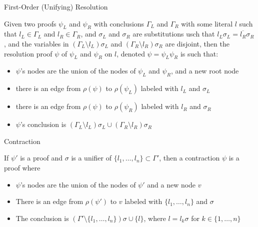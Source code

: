 {
\begin{frame}{First-Order (Unifying) Resolution}
\begin{definition}
Given two proofs $\psi_L$ and $\psi_R$ with conclusions $\Gamma_L$ and $\Gamma_R$ with some literal $l$ such that $l_L\in \Gamma_L$ and $l_R\in \Gamma_R$, and $\sigma_L$ and $\sigma_R$ are substitutions usch that $l_L\sigma_L=\overline{l_R}\sigma_R$, and the variables in $(\Gamma_L\setminus l_L)\sigma_L$ and $(\Gamma_R\setminus l_R)\sigma_R$ are disjoint, then the resolution proof $\psi$ of $\psi_L$ and $\psi_R$ on $l$, denoted $\psi=\psi_L \psi_R$ is such that:
\begin{itemize}
\item $\psi$'s nodes are the union of the nodes of $\psi_L$ and $\psi_R$, and a new root node
\item there is an edge from $\rho(\psi)$ to $\rho(\psi_L)$ labeled with $l_L$ and $\sigma_L$
\item there is an edge from $\rho(\psi)$ to $\rho(\psi_R)$ labeled with $l_R$ and $\sigma_R$
\item $\psi$'s conclusion is $(\Gamma_L\setminus l_L)\sigma_L\cup (\Gamma_R\setminus l_R)\sigma_R$
\end{itemize}
\end{definition}
\end{frame}
}

{
\begin{frame}{Contraction}
\begin{definition}[Contraction]
If $\psi'$ is a proof and $\sigma$ is a unifier of $\{l_1,\ldots,l_n\}\subset \Gamma'$, then a contraction $\psi$ is a proof where
\begin{itemize}
\item $\psi$'s nodes are the union of the nodes of $\psi'$ and a new node $v$
\item There is an edge from $\rho(\psi')$ to $v$ labeled with $\{l_1,\ldots,l_n\}$ and $\sigma$
\item The conclusion is $(\Gamma'\setminus \{l_1,\ldots,l_n\})\sigma \cup \{l\}$, where $l=l_k\sigma$ for $k\in \{1,\ldots,n\}$
\end{itemize}
\end{definition}
\end{frame}
}